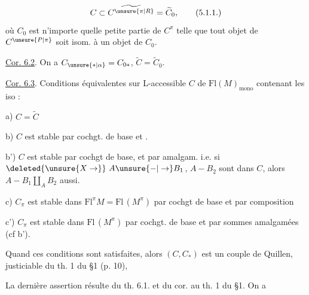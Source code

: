 \[
 C\subset\widetilde{C^{\unsure{\pi|R}}}=\widetilde C_0,
 \tag*{(5.1.1.)}
\]
où $C_0$ est n'importe quelle petite partie de $C^\pi$ telle que tout objet de $C^{\unsure{P|\pi}}$ soit isom. à un objet de $C_0$.

\uline{Cor. 6.2}. On a $C_{\unsure{\ast|\alpha}}=C_{0\ast}$, $\widetilde C=\widetilde C_0$.


\uline{Cor. 6.3}. Conditions équivalentes sur   L-accessible $C$ de $\mathrm{Fl}(M)_{\mathrm{mono}}$ \unsure{;} contenant les iso :

a) $C=\widetilde C$

b) $C$ est stable par cochgt. de base et .

b') $C$ est stable par cochgt de base, et par  amalgam.  i.e. si $\deleted{\unsure{X\to}}\ A\unsure{-|\to} B_1$, $A-B_2$ sont dans $C$, alors $A-B_1\amalg_A B_2$ aussi.

c) $C_\pi$ est stable dans $\mathrm{Fl}^\pi M=\mathrm{Fl}\,(M^\pi)$ par cochgt de base et par composition

c') $C_\pi$ est stable dans $\mathrm{Fl}\,(M^\pi)$ par cochgt. de base et par sommes amalgamées (cf b').

Quand ces conditions sont satisfaites, alors $(C,C_\ast)$ est un couple de Quillen, justiciable du th. 1 du §1 (p. 10), 

La dernière assertion résulte du th. 6.1. et du cor. au th. 1 du §1. On a

